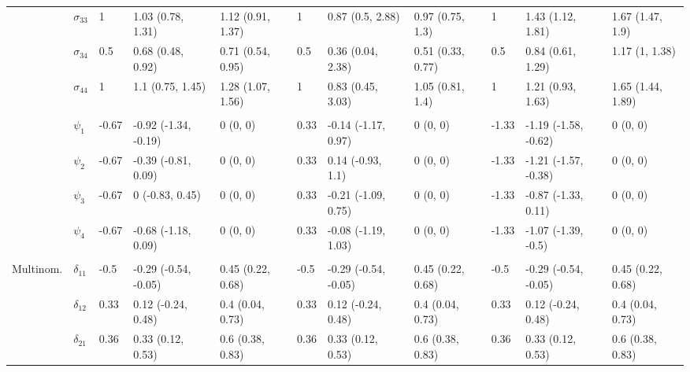 \documentclass[]{article}
\begin{document}
\begin{landscape}
\begin{table}[t]
\begin{tabular}{lllllllllll}
\hspace{1em} & $\sigma_{33}$ & 1 & 1.03 (0.78, 1.31) & 1.12 (0.91, 1.37) & 1 & 0.87 (0.5, 2.88) & 0.97 (0.75, 1.3) & 1 & 1.43 (1.12, 1.81) & 1.67 (1.47, 1.9)\\
\hspace{1em} & $\sigma_{34}$ & 0.5 & 0.68 (0.48, 0.92) & 0.71 (0.54, 0.95) & 0.5 & 0.36 (0.04, 2.38) & 0.51 (0.33, 0.77) & 0.5 & 0.84 (0.61, 1.29) & 1.17 (1, 1.38)\\
\hspace{1em} & $\sigma_{44}$ & 1 & 1.1 (0.75, 1.45) & 1.28 (1.07, 1.56) & 1 & 0.83 (0.45, 3.03) & 1.05 (0.81, 1.4) & 1 & 1.21 (0.93, 1.63) & 1.65 (1.44, 1.89)\\
\addlinespace[0.3em]
\multicolumn{11}{l}{\textbf{ }}\\
\hspace{1em} & $\psi_{1}$ & -0.67 & -0.92 (-1.34, -0.19) & 0 (0, 0) & 0.33 & -0.14 (-1.17, 0.97) & 0 (0, 0) & -1.33 & -1.19 (-1.58, -0.62) & 0 (0, 0)\\
\hspace{1em} & $\psi_{2}$ & -0.67 & -0.39 (-0.81, 0.09) & 0 (0, 0) & 0.33 & 0.14 (-0.93, 1.1) & 0 (0, 0) & -1.33 & -1.21 (-1.57, -0.38) & 0 (0, 0)\\
\hspace{1em} & $\psi_{3}$ & -0.67 & 0 (-0.83, 0.45) & 0 (0, 0) & 0.33 & -0.21 (-1.09, 0.75) & 0 (0, 0) & -1.33 & -0.87 (-1.33, 0.11) & 0 (0, 0)\\
\hspace{1em} & $\psi_{4}$ & -0.67 & -0.68 (-1.18, 0.09) & 0 (0, 0) & 0.33 & -0.08 (-1.19, 1.03) & 0 (0, 0) & -1.33 & -1.07 (-1.39, -0.5) & 0 (0, 0)\\
\addlinespace[0.3em]
\multicolumn{11}{l}{\textbf{ }}\\
\hspace{1em}Multinom. & $\delta_{11}$ & -0.5 & -0.29 (-0.54, -0.05) & 0.45 (0.22, 0.68) & -0.5 & -0.29 (-0.54, -0.05) & 0.45 (0.22, 0.68) & -0.5 & -0.29 (-0.54, -0.05) & 0.45 (0.22, 0.68)\\
\hspace{1em} & $\delta_{12}$ & 0.33 & 0.12 (-0.24, 0.48) & 0.4 (0.04, 0.73) & 0.33 & 0.12 (-0.24, 0.48) & 0.4 (0.04, 0.73) & 0.33 & 0.12 (-0.24, 0.48) & 0.4 (0.04, 0.73)\\
\hspace{1em} & $\delta_{21}$ & 0.36 & 0.33 (0.12, 0.53) & 0.6 (0.38, 0.83) & 0.36 & 0.33 (0.12, 0.53) & 0.6 (0.38, 0.83) & 0.36 & 0.33 (0.12, 0.53) & 0.6 (0.38, 0.83)\\

\end{tabular}
\end{table}
\end{landscape}
\end{document}
